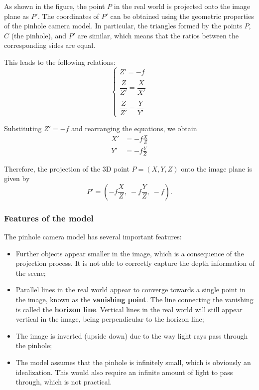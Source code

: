 As shown in the figure, the point $P$ in the real world is projected onto the image plane as $P'$. 
The coordinates of $P'$ can be obtained using the geometric properties of the pinhole camera model. 
In particular, the triangles formed by the points $P$, $C$ (the pinhole), and $P'$ are similar, 
which means that the ratios between the corresponding sides are equal.

This leads to the following relations:
\begin{equation*}
\begin{cases}
Z' = -f \\\\
\dfrac{Z}{Z'} = \dfrac{X}{X'} \\\\
\dfrac{Z}{Z'} = \dfrac{Y}{Y'}
\end{cases}
\end{equation*}

Substituting $Z' = -f$ and rearranging the equations, we obtain
\begin{align*}
X' &= -f \frac{X}{Z} \\
Y' &= -f \frac{Y}{Z}
\end{align*}

Therefore, the projection of the 3D point $P=(X,Y,Z)$ onto the image plane is given by
\[
P' = \left(-f \frac{X}{Z},\; -f \frac{Y}{Z},\; -f\right).
\]

\subsubsection{Features of the model}
The pinhole camera model has several important features:
\begin{itemize}
    \item Further objects appear smaller in the image, which is a consequence of the projection process. It is not able to correctly capture the depth information of the scene;
    \item Parallel lines in the real world appear to converge towards a single point in the image, known as the \textbf{vanishing point}. The line connecting the vanishing is called the \textbf{horizon line}.
    Vertical lines in the real world will still appear vertical in the image, being perpendicular to the horizon line;
    \item The image is inverted (upside down) due to the way light rays pass through the pinhole;
    \item The model assumes that the pinhole is infinitely small, which is obviously an idealization. This would also require an infinite
    amount of light to pass through, which is not practical. 
\end{itemize}

